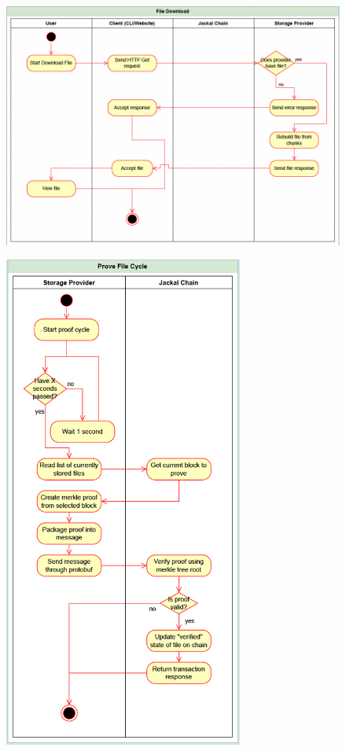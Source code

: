 \documentclass[a4paper]{article}
\begin{document}
\begin{figure}[!htbp]
\centering
\includegraphics[width=1\textwidth]{assets/providers3.png}
\caption{}
\end{figure}

\begin{figure}[hbt!]
\centering
\includegraphics[width=0.7\textwidth]{assets/providers4.png}
\caption{}
\end{figure}
\end{document}
